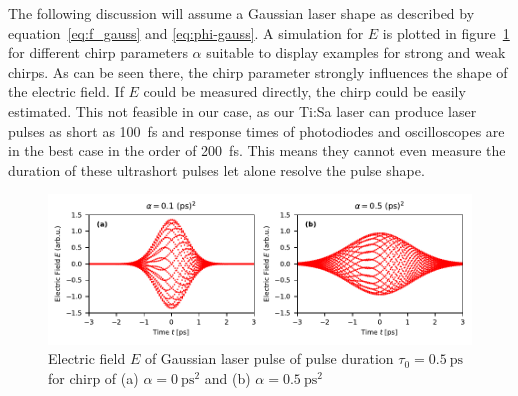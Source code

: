 The following discussion will assume a Gaussian laser shape as described by equation~\eqref{eq:f_gauss} and \eqref{eq:phi-gauss}.
A simulation for $E$ is plotted in figure~\ref{fig:chirpedlaserpulse} for different chirp parameters $\alpha$ suitable to display examples for strong and weak chirps.
As can be seen there, the chirp parameter strongly influences the shape of the electric field.
If $E$ could be measured directly, the chirp could be easily estimated.
This not feasible in our case, as our Ti:Sa laser can produce laser pulses as short as \SI{100}{\femto \second} and response times of photodiodes and oscilloscopes are in the best case in the order of \SI{200}{\femto \second}.
This means they cannot even measure the duration of these ultrashort pulses let alone resolve the pulse shape.

\begin{figure}[H]
	\centering
	\includegraphics[width=\linewidth]{figures/chirp/plots/chirped_laser_pulse}
	\caption{Electric field $E$ of Gaussian laser pulse of pulse duration $\tau_0=\SI{0.5}{\pico \second}$ for chirp of (a) $\alpha = \SI{0}{\pico \second \squared}$ and (b) $\alpha = \SI{0.5}{\pico \second \squared}$}
	\label{fig:chirpedlaserpulse}
\end{figure}

\newpage


